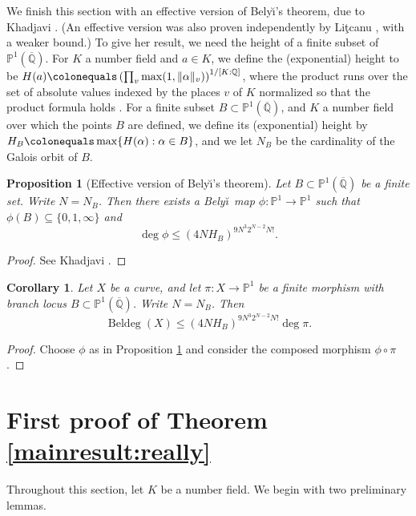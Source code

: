 \documentclass{amsproc}
\numberwithin{equation}{section}
\numberwithin{figure}{section}
\newtheorem{proposition}[equation]{Proposition}
\newtheorem{corollary}[equation]{Corollary}
\theoremstyle{definition}
\theoremstyle{remark}
\DeclareMathOperator{\Beldeg}{Beldeg}
\newcommand{\Qbar}{\overline{\mathbb{Q}}}
\newcommand{\Q}{\QQ}
\newcommand\PP{\mathbb{P}}
\newcommand\QQ{\mathbb{Q}}
\newcommand{\p}{\mathbb{P}}
\renewcommand{\leq}{\leqslant}
\newcommand{\Belyi}{Bely\u{\i}}
\newcommand{\defi}[1]{\textsf{#1}} 	%
\begin{document}
We finish this section with an effective version of \Belyi{}'s theorem, due to Khadjavi \cite{Khadjavi}.  (An effective version was also proven independently by Li\c{t}canu \cite[Th\'eor\`eme 4.3]{Litcanu}, with a weaker bound.)  To give her result, we need the height of a finite subset of $\p^1(\Qbar)$.  For $K$ a number field and $a \in K$, we define the \defi{(exponential) height} to be $H(a) \colonequals \left( \prod_v \max(1,\Vert \alpha\Vert_v) \right)^{1/[K:\Q]}$, where the product runs over the set of absolute values indexed by the places $v$ of $K$ normalized so that the product formula holds \cite[Section 2]{Khadjavi}.  For a finite subset $B \subset \p^1(\Qbar)$, and $K$ a number field over which the points $B$ are defined, we define its \defi{(exponential) height} by $H_B \colonequals \max \{H(\alpha) : \alpha \in B\}$, and we let $N_B$ be the cardinality of the Galois orbit of $B$. 

\begin{proposition} [Effective version of \Belyi{}'s theorem] \label{prop: khad}
Let $B\subset \PP^1(\Qbar)$ be  a finite set. Write $N = N_B$. Then there exists a \Belyi\ map $\phi\colon \p^1\to \p^1$ such that
$\phi(B) \subseteq \{0,1,\infty\}$ and  $$\deg \phi \leq (4NH_B)^{9N^3 2^{N-2}N!}.$$ 
\end{proposition}
\begin{proof}
See Khadjavi \cite[Theorem 1.1.c]{Khadjavi}.
\end{proof}

\begin{corollary}
Let $X$ be a   curve, and let $\pi\colon X\to \p^1$ be a finite morphism with branch locus $B\subset \p^1(\Qbar)$. Write $N= N_B$. Then \[ \Beldeg(X) \leq (4NH_B)^{9N^3 2^{N-2}N!} \deg \pi.\]
\end{corollary}
\begin{proof}
Choose $\phi$ as in Proposition \ref{prop: khad} and consider the composed morphism $\phi\circ \pi$. 
\end{proof}



 


\section{First proof of Theorem \ref{mainresult:really}} \label{section: proof}


 

Throughout this section, let $K$ be a number field.  We begin with two preliminary lemmas.  
 
\end{document}
